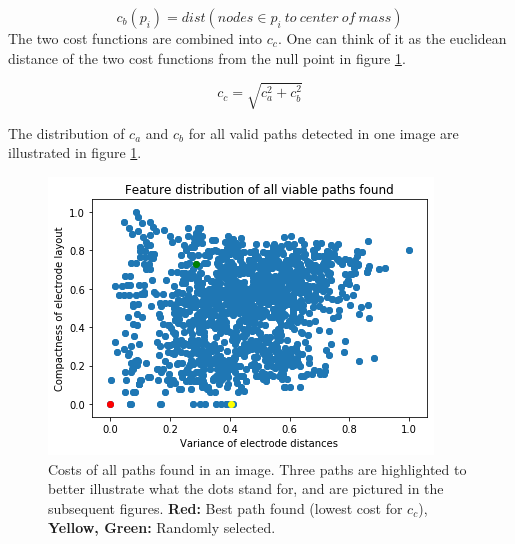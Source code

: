 \documentclass[a4paper, 11pt]{article}
\begin{document}
\begin{enumerate}
$$ c_b(p_i)=dist (nodes \in p_i\ to\ center\ of\ mass)$$
The two cost functions are combined into $c_ {c}$. One can think of it as the euclidean distance of the two cost functions from the null point in figure \ref{feature_distribution}.

$$c_{c} = \sqrt{c_a^2+c_b^2}$$

The distribution of $c_a$ and $c_b$ for all valid paths detected in one image are illustrated in figure \ref{feature_distribution}.

\begin{figure}[ht]
	\centering
  \includegraphics[width=.5\textwidth]{feature_distribution.png}
	\caption{Costs of all paths found in an image. Three paths are highlighted to better illustrate what the dots stand for, and are pictured in the subsequent figures. \textbf{Red:} Best path found (lowest cost for $c_c$), \textbf{Yellow, Green:} Randomly selected.}
	\label{feature_distribution}
\end{figure}



\end{enumerate}
\end{document}
